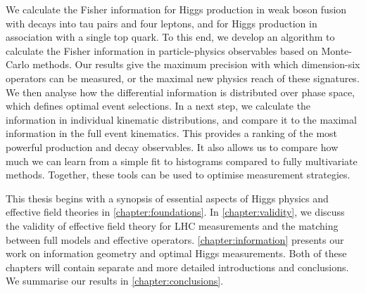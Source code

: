 We calculate the Fisher information for Higgs production in weak boson
fusion with decays into tau pairs and four leptons, and for Higgs
production in association with a single top quark. To this end, we
develop an algorithm to calculate the Fisher information in
particle-physics observables based on Monte-Carlo methods. Our results
give the maximum precision with which dimension-six operators can be
measured, or the maximal new physics reach of these
signatures. We then analyse how the differential information is
distributed over phase space, which defines optimal event
selections. In a next step, we calculate the information in individual
kinematic distributions, and compare it to the maximal information in
the full event kinematics. This provides a ranking of the most
powerful production and decay observables. It also allows us to
compare how much we can learn from a simple fit to histograms compared
to fully multivariate methods. Together, these tools can be used to
optimise measurement strategies.

\newparagraph
%
This thesis begins with a synopsis of essential aspects of Higgs
physics and effective field theories in
\autoref{chapter:foundations}. In \autoref{chapter:validity}, we
discuss the validity of effective field theory for LHC measurements
and the matching between full models and effective
operators. \autoref{chapter:information} presents our work on
information geometry and optimal Higgs measurements. Both of these
chapters will contain separate and more detailed introductions and
conclusions. We summarise our results in
\autoref{chapter:conclusions}.

